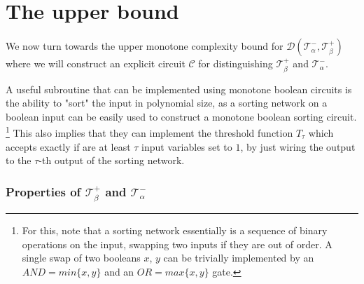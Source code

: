 \section{The upper bound}

We now turn towards the upper monotone complexity bound for $\mathcal{D}(\mathcal{T}^-_\alpha, \mathcal{T}^+_\beta)$ where we will construct an explicit circuit $\mathcal{C}$ for distinguishing  $\mathcal{T}^+_\beta$ and $\mathcal{T}^-_\alpha$.

A useful subroutine that can be implemented using monotone boolean circuits is the ability to "sort" the input in polynomial size, as a sorting network on a boolean input can be easily used to construct a monotone boolean sorting circuit. \footnote{For this, note that a sorting network essentially is a sequence of binary operations on the input, swapping two inputs if they are out of order. A single swap of two booleans $x$, $y$ can be trivially implemented by an $AND = min\{x, y\}$ and an $OR = max\{x, y\}$ gate.} This also implies that they can implement the threshold function $T_\tau$ which accepts exactly if are at least $\tau$ input variables set to $1$, by just wiring the output to the $\tau$-th output of the sorting network.

\subsubsection*{Properties of $\mathcal{T}^+_\beta$ and $\mathcal{T}^-_\alpha$}


